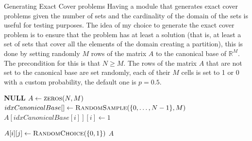 \documentclass{beamer}
\begin{document}
\begin{frame}{Generating Exact Cover problems}
    Having a module that generates exact cover problems given the 
    number of sets and the cardinality of the domain of the sets is
    useful for testing purposes.
    The idea of my choice to generate the exact cover problem is to ensure
    that the problem has at least a solution (that is, at least a set 
    of sets that cover all the elements of the domain creating a partition),
    this is done by setting randomly $M$ rows of the matrix $A$ to 
    the canonical base of $\mathbb{R}^M$.
    The precondition for this is that $N \geq M$.
    The rows of the matrix $A$ that are not set to the canonical base
    are set randomly, each of their $M$ cells is set to 1 or 0 with
    a custom probability, the default one is $p=0.5$.
\end{frame}

\begin{frame}{}
    \begin{algorithmic}
                \State \Return \textbf{NULL}
            \EndIf
            \State $A \gets \Call{zeros}{N, M}$
            \State $idxCanonicalBase[] \gets \Call{RandomSample}{\{0,\dots,N-1\}, M}$ 
                \State $A[idxCanonicalBase[i]][i] \gets 1$
            \EndFor

                        \State $A[i][j] \gets \Call{RandomChoice}{\{0,1\}}$
                    \EndFor
                \EndIf
            \EndFor
            \State \Return $A$
        \EndFunction
    \end{algorithmic}
\end{frame}          
\end{document}
